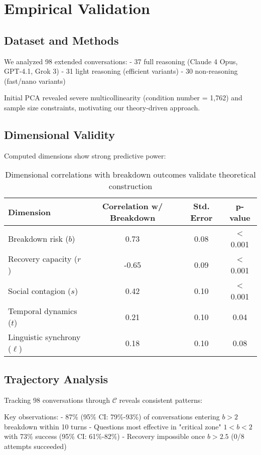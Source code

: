 \documentclass[11pt,letterpaper]{article}
\begin{document}
\section{Empirical Validation}

\subsection{Dataset and Methods}

We analyzed 98 extended conversations:
- 37 full reasoning (Claude 4 Opus, GPT-4.1, Grok 3)
- 31 light reasoning (efficient variants)
- 30 non-reasoning (fast/nano variants)

Initial PCA revealed severe multicollinearity (condition number = 1,762) and sample size constraints, motivating our theory-driven approach.

\subsection{Dimensional Validity}

Computed dimensions show strong predictive power:

\begin{table}[h]
\centering
\begin{tabular}{lccc}
\toprule
Dimension & Correlation w/ Breakdown & Std. Error & p-value \\
\midrule
Breakdown risk ($b$) & 0.73 & 0.08 & < 0.001 \\
Recovery capacity ($r$) & -0.65 & 0.09 & < 0.001 \\
Social contagion ($s$) & 0.42 & 0.10 & < 0.001 \\
Temporal dynamics ($t$) & 0.21 & 0.10 & 0.04 \\
Linguistic synchrony ($\ell$) & 0.18 & 0.10 & 0.08 \\
\bottomrule
\end{tabular}
\caption{Dimensional correlations with breakdown outcomes validate theoretical construction}
\label{tab:validity}
\end{table}

\subsection{Trajectory Analysis}

Tracking 98 conversations through $\mathcal{C}$ reveals consistent patterns:

Key observations:
- 87\% (95\% CI: 79\%-93\%) of conversations entering $b > 2$ breakdown within 10 turns
- Questions most effective in "critical zone" $1 < b < 2$ with 73\% success (95\% CI: 61\%-82\%)
- Recovery impossible once $b > 2.5$ (0/8 attempts succeeded)
\end{document}
